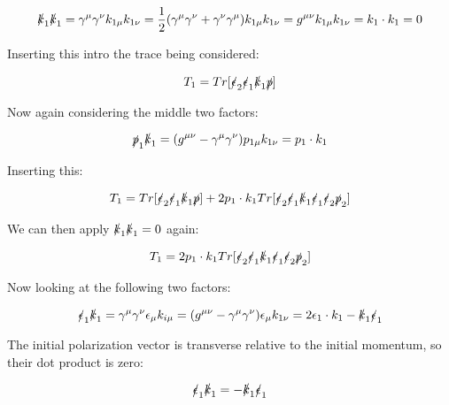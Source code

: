 \documentclass[a4]{article}
\begin{document}
    \begin{equation}
        \slashed{k}_1 \slashed{k}_1 = \gamma^\mu \gamma^\nu k_{1 \mu} k_{1 \nu} = \frac{1}{2} (\gamma^\mu \gamma^\nu + \gamma^\nu \gamma^\mu) k_{1 \mu} k_{1 \nu} = g^{\mu \nu} k_{1 \mu} k_{1 \nu} = k_1 \cdot k_1 = 0
    \end{equation}

    Inserting this intro the trace being considered:

    \begin{equation}
        T_1 = Tr [\slashed{\epsilon}_2 \slashed{\epsilon}_1 \slashed{k}_1 \slashed{p}]
    \end{equation}

    Now again considering the middle two factors:

    \begin{equation}
        \slashed{p}_1 \slashed{k}_1 = (g^{\mu \nu} - \gamma^\mu \gamma^\nu) p_{1 \mu} k_{1 \nu} = p_1 \cdot k_1
    \end{equation}

    Inserting this:

    \begin{equation}
        T_1 = Tr [\slashed{\epsilon}_2 \slashed{\epsilon}_1 \slashed{k}_1 \slashed{p}] + 2 p_1 \cdot k_1 Tr[\slashed{\epsilon}_2 \slashed{\epsilon}_1 \slashed{k}_1 \slashed{\epsilon}_1 \slashed{\epsilon}_2 \slashed{p}_2]
    \end{equation}

    We can then apply $\slashed{k}_1 \slashed{k}_1 = 0$ again:

    \begin{equation}
        T_1 = 2 p_1 \cdot k_1 Tr[\slashed{\epsilon}_2 \slashed{\epsilon}_1 \slashed{k}_1 \slashed{\epsilon}_1 \slashed{\epsilon}_2 \slashed{p}_2]
    \end{equation}

    Now looking at the following two factors:

    \begin{equation}
        \slashed{\epsilon}_1 \slashed{k}_1 = \gamma^\mu \gamma^\nu \epsilon_\mu k_{i \mu} = (g^{\mu \nu} - \gamma^\mu \gamma^\nu) \epsilon_{\mu} k_{1 \nu} = 2 \epsilon_1 \cdot k_1 - \slashed{k}_1 \slashed{\epsilon}_1
    \end{equation}

    The initial polarization vector is transverse relative to the initial momentum, so their dot product is zero:

    \[
        \slashed{\epsilon}_1 \slashed{k}_1 = - \slashed{k}_1 \slashed{\epsilon}_1
    \]
\end{document}
